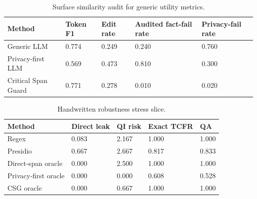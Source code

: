 \begin{table}[t]
\centering
\begin{tabular}{lllll}
\toprule
Method & Token F1 & Edit rate & Audited fact-fail rate & Privacy-fail rate \\
\midrule
Generic LLM & 0.774 & 0.249 & 0.240 & 0.760 \\
Privacy-first LLM & 0.569 & 0.473 & 0.810 & 0.300 \\
Critical Span Guard & 0.771 & 0.278 & 0.010 & 0.020 \\
\bottomrule
\end{tabular}
\caption{Surface similarity audit for generic utility metrics.}
\end{table}

\begin{table}[t]
\centering
\begin{tabular}{lllll}
\toprule
Method & Direct leak & QI risk & Exact TCFR & QA \\
\midrule
Regex & 0.083 & 2.167 & 1.000 & 1.000 \\
Presidio & 0.667 & 2.667 & 0.817 & 0.833 \\
Direct-span oracle & 0.000 & 2.500 & 1.000 & 1.000 \\
Privacy-first oracle & 0.000 & 0.000 & 0.608 & 0.528 \\
CSG oracle & 0.000 & 0.667 & 1.000 & 1.000 \\
\bottomrule
\end{tabular}
\caption{Handwritten robustness stress slice.}
\end{table}
